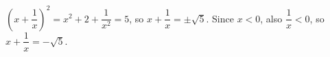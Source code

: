 $\left(x+\dfrac{1}{x}\right)^2=x^2+2+\dfrac{1}{x^2}=5$, so $x+\dfrac{1}{x}=\pm\sqrt5$. Since $x<0$, also $\dfrac{1}{x}<0$, so $x+\dfrac{1}{x}=\boxed{-\sqrt5}$.
